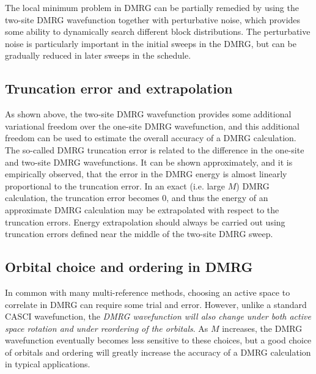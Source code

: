 \documentclass[letterpaper,12pt,aps, pra]{revtex4-1}
\begin{document}
The local minimum problem in DMRG can be partially remedied by using the two-site DMRG wavefunction
together with perturbative noise, which provides some ability
to dynamically search different block distributions. The perturbative noise is particularly important
in the initial sweeps in the DMRG, but can be gradually reduced 
in later sweeps in the schedule.


\subsection{Truncation error and extrapolation}\label{sec:convergence2}

As shown above, the two-site DMRG wavefunction provides some additional
variational freedom over the one-site DMRG wavefunction, and this additional freedom
can be used to estimate the overall accuracy of a DMRG calculation. The so-called DMRG truncation
error is related to the difference in the one-site and two-site DMRG wavefunctions. 
 It can be shown approximately, and it is empirically observed,
that the error in the DMRG energy is almost linearly proportional to the truncation error. 
In an exact
(i.e. large $M$) DMRG calculation, the truncation error becomes 0, and thus
the energy of an approximate DMRG calculation may be  extrapolated with respect to the truncation errors. %
Energy extrapolation should always be carried out using truncation errors defined near the middle of the two-site DMRG sweep.

\subsection{Orbital choice and ordering in DMRG}\label{sec:appendix2}

In common with many multi-reference methods, choosing an active space to correlate in DMRG can
require some trial and error. However, unlike a standard CASCI wavefunction, the {\it DMRG wavefunction will also  change under both active space rotation and under reordering of the orbitals}.
As $M$ increases, the DMRG wavefunction eventually becomes less sensitive to these choices, but
a good choice of orbitals and ordering will greatly increase the accuracy of a DMRG calculation in typical applications. 
\end{document}
